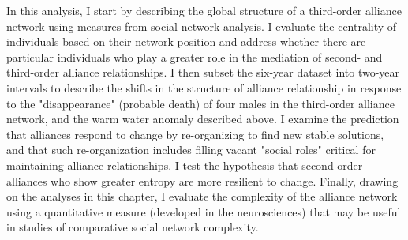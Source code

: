 \documentclass[11pt]{amsart}
\begin{document}
In this analysis, I start by describing the global structure of a third-order alliance network using measures from social network analysis. I evaluate the centrality of individuals based on their network position and address whether there are particular individuals who play a greater role in the mediation of second- and third-order alliance relationships. I then subset the six-year dataset into two-year intervals to describe the shifts in the structure of alliance relationship in response to the "disappearance" (probable death) of four males in the third-order alliance network, and the warm water anomaly described above. I examine the prediction that alliances respond to change by re-organizing to find new stable solutions, and that such re-organization includes filling vacant "social roles" critical for maintaining alliance relationships. I test the hypothesis that second-order alliances who show greater entropy are more resilient to change. Finally, drawing on the analyses in this chapter, I evaluate the complexity of the alliance network using a quantitative measure (developed in the neurosciences) that may be useful in studies of comparative social network complexity. 
\end{document}
